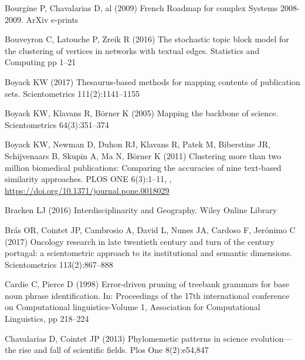 \documentclass[10pt]{article}
\begin{document}
\begin{thebibliography}{84}
{Bourgine} P, {Chavalarias} D, al (2009) {French Roadmap for complex Systems
  2008-2009}. ArXiv e-prints 

Bouveyron C, Latouche P, Zreik R (2016) The stochastic topic block model for
  the clustering of vertices in networks with textual edges. Statistics and
  Computing pp 1--21

Boyack KW (2017) Thesaurus-based methods for mapping contents of publication
  sets. Scientometrics 111(2):1141--1155

Boyack KW, Klavans R, B{\"o}rner K (2005) Mapping the backbone of science.
  Scientometrics 64(3):351--374

Boyack KW, Newman D, Duhon RJ, Klavans R, Patek M, Biberstine JR, Schijvenaars
  B, Skupin A, Ma N, Börner K (2011) Clustering more than two million
  biomedical publications: Comparing the accuracies of nine text-based
  similarity approaches. PLOS ONE 6(3):1--11,
  ,
  \urlprefix\url{https://doi.org/10.1371/journal.pone.0018029}

Bracken LJ (2016) Interdisciplinarity and Geography. Wiley Online Library

Br{\'a}s OR, Cointet JP, Cambrosio A, David L, Nunes JA, Cardoso F,
  Jer{\'o}nimo C (2017) Oncology research in late twentieth century and turn of
  the century portugal: a scientometric approach to its institutional and
  semantic dimensions. Scientometrics 113(2):867--888

Cardie C, Pierce D (1998) Error-driven pruning of treebank grammars for base
  noun phrase identification. In: Proceedings of the 17th international
  conference on Computational linguistics-Volume 1, Association for
  Computational Linguistics, pp 218--224

Chavalarias D, Cointet JP (2013) Phylomemetic patterns in science
  evolution---the rise and fall of scientific fields. Plos One 8(2):e54,847


\end{thebibliography}
\end{document}
